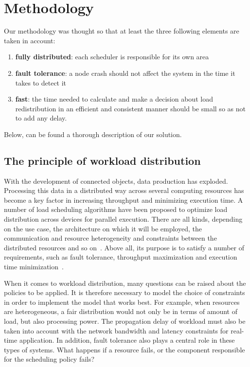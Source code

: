\section{Methodology}\label{sec:methodology}

Our methodology was thought so that at least the three following elements are taken in account:
\begin{enumerate}
    \item \textbf{fully distributed}: each scheduler is responsible for its own area
    \item \textbf{fault tolerance}: a node crash should not affect the system in the time it takes to detect it
    \item \textbf{fast}: the time needed to calculate and make a decision about load redistribution in an efficient and consistent manner should be small so as not to add any delay.
\end{enumerate}

Below, can be found a thorough description of our solution.

\subsection{The principle of workload distribution}

With the development of connected objects, data production has exploded. Processing this data in a distributed way across several computing resources has become a key factor in increasing throughput and minimizing execution time. A number of load scheduling algorithms have been proposed to optimize load distribution across devices for parallel execution. There are all kinds, depending on the use case, the architecture on which it will be employed, the communication and resource heterogeneity and constraints between the distributed resources and so on~\cite{ghomi2017load, mishra2020load, pourghebleh2020comprehensive, kaur2015review}. Above all, its purpose is to satisfy a number of requirements, such as fault tolerance, throughput maximization and execution time minimization~\cite{kaur2015review}.

When it comes to workload distribution, many questions can be raised about the policies to be applied. It is therefore necessary to model the choice of constraints in order to implement the model that works best. For example, when resources are heterogeneous, a fair distribution would not only be in terms of amount of load, but also processing power. The propagation delay of workload must also be taken into account with the network bandwidth and latency constraints for real-time application. In addition, fault tolerance also plays a central role in these types of systems. What happens if a resource fails, or the component responsible for the scheduling policy fails?





